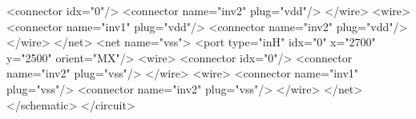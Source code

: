 \begin{DoxyCodeInclude}
        <\textcolor{keywordtype}{connector} \textcolor{keyword}{idx}=\textcolor{stringliteral}{"0"}/>
        <\textcolor{keywordtype}{connector} \textcolor{keyword}{name}=\textcolor{stringliteral}{"inv2"} \textcolor{keyword}{plug}=\textcolor{stringliteral}{"vdd"}/>
      </\textcolor{keywordtype}{wire}>
      <\textcolor{keywordtype}{wire}>
        <\textcolor{keywordtype}{connector} \textcolor{keyword}{name}=\textcolor{stringliteral}{"inv1"} \textcolor{keyword}{plug}=\textcolor{stringliteral}{"vdd"}/>
        <\textcolor{keywordtype}{connector} \textcolor{keyword}{name}=\textcolor{stringliteral}{"inv2"} \textcolor{keyword}{plug}=\textcolor{stringliteral}{"vdd"}/>
      </\textcolor{keywordtype}{wire}>
    </\textcolor{keywordtype}{net}>
    <\textcolor{keywordtype}{net} \textcolor{keyword}{name}=\textcolor{stringliteral}{"vss"}>
      <\textcolor{keywordtype}{port} \textcolor{keyword}{type}=\textcolor{stringliteral}{"inH"} \textcolor{keyword}{idx}=\textcolor{stringliteral}{"0"} \textcolor{keyword}{x}=\textcolor{stringliteral}{"2700"} \textcolor{keyword}{y}=\textcolor{stringliteral}{"2500"} \textcolor{keyword}{orient}=\textcolor{stringliteral}{"MX"}/>
      <\textcolor{keywordtype}{wire}>
        <\textcolor{keywordtype}{connector} \textcolor{keyword}{idx}=\textcolor{stringliteral}{"0"}/>
        <\textcolor{keywordtype}{connector} \textcolor{keyword}{name}=\textcolor{stringliteral}{"inv2"} \textcolor{keyword}{plug}=\textcolor{stringliteral}{"vss"}/>
      </\textcolor{keywordtype}{wire}>
      <\textcolor{keywordtype}{wire}>
        <\textcolor{keywordtype}{connector} \textcolor{keyword}{name}=\textcolor{stringliteral}{"inv1"} \textcolor{keyword}{plug}=\textcolor{stringliteral}{"vss"}/>
        <\textcolor{keywordtype}{connector} \textcolor{keyword}{name}=\textcolor{stringliteral}{"inv2"} \textcolor{keyword}{plug}=\textcolor{stringliteral}{"vss"}/>
      </\textcolor{keywordtype}{wire}>
    </\textcolor{keywordtype}{net}>
  </\textcolor{keywordtype}{schematic}>
</\textcolor{keywordtype}{circuit}>
\end{DoxyCodeInclude}


